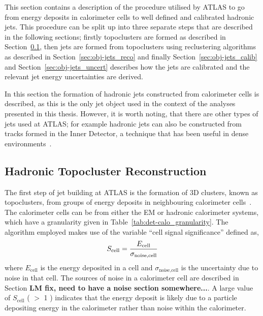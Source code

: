 This section contains a description of the procedure utilised by ATLAS
to go from energy deposits in calorimeter cells to well defined and calibrated hadronic jets.
This procedure can be split up into three separate steps that are described in the following sections;
firstly topoclusters are formed as described in Section~\ref{sec:obj-jets_topo},
then jets are formed from topoclusters using reclustering algorithms as described in Section~\ref{sec:obj-jets_reco}
and finally Section~\ref{sec:obj-jets_calib} and Section~\ref{sec:obj-jets_uncert}
describes how the jets are calibrated and the relevant jet energy uncertainties are derived.

In this section the formation of hadronic jets constructed from calorimeter cells is described,
as this is the only jet object used in the context of the analyses presented in this thesis.
However, it is worth noting, that there are other types of jets used at ATLAS;
for example hadronic jets can also be constructed from tracks formed in the Inner Detector,
a technique that has been useful in dense environments~\cite{obj-Hbb}.

\subsection{Hadronic Topocluster Reconstruction}
\label{sec:obj-jets_topo}

The first step of jet building at ATLAS is the formation of 3D clusters, known as topoclusters, from groups of energy deposits in neighbouring calorimeter cells~\cite{obj-jets_topo}.
The calorimeter cells can be from either the EM or hadronic calorimeter systems,
which have a granularity given in Table~\ref{tab:det-calo_granularity}.
The algorithm employed makes use of the variable ``cell signal significance'' defined as, 
\begin{equation}
  \Large{S_{\text{cell}} = \frac{E_{\text{cell}}}{\sigma_{\text{noise,cell}}}}
\end{equation}
where $E_{\text{cell}}$ is the energy deposited in a cell
and $\sigma_{\text{noise,cell}}$ is the uncertainty due to noise in that cell.
The sources of noise in a calorimeter cell are described in Section \textbf{LM fix, need to have a noise section somewhere...}.
A large value of $S_{\text{cell}}$ ( $>$ 1 ) indicates that the energy deposit is likely due to a particle
depositing energy in the calorimeter rather than noise within the calorimeter.

